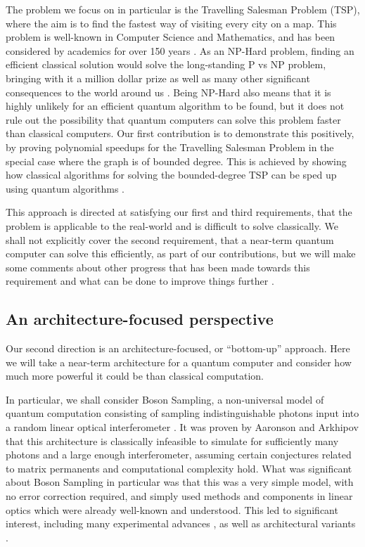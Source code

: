 The problem we focus on in particular is the Travelling Salesman Problem (TSP), where the aim is to find the fastest way of visiting every city on a map. This problem is well-known in Computer Science and Mathematics, and has been considered by academics for over 150 years \cite{schrijver2005}. As an NP-Hard problem, finding an efficient classical solution would solve the long-standing P vs NP problem, bringing with it a million dollar prize as well as many other significant consequences to the world around us \cite{cmipvsnp, aaronson2006}. Being NP-Hard also means that it is highly unlikely for an efficient quantum algorithm to be found, but it does not rule out the possibility that quantum computers can solve this problem faster than classical computers. Our first contribution is to demonstrate this positively, by proving polynomial speedups for the Travelling Salesman Problem in the special case where the graph is of bounded degree. This is achieved by showing how classical algorithms for solving the bounded-degree TSP \cite{eppstein2007, xiao2016degree3, xiao2016degree4} can be sped up using quantum algorithms \cite{montanaro2015, ronagh2019}.

This approach is directed at satisfying our first and third requirements, that the problem is applicable to the real-world and is difficult to solve classically. We shall not explicitly cover the second requirement, that a near-term quantum computer can solve this efficiently, as part of our contributions, but we will make some comments about other progress that has been made towards this requirement and what can be done to improve things further \cite{dunjko2018, ge2019}.

\subsection{An architecture-focused perspective}

Our second direction is an architecture-focused, or ``bottom-up'' approach. Here we will take a near-term architecture for a quantum computer and consider how much more powerful it could be than classical computation.

In particular, we shall consider Boson Sampling, a non-universal model of quantum computation consisting of sampling indistinguishable photons input into a random linear optical interferometer \cite{aaronson2010report, aaronson2011}. It was proven by Aaronson and Arkhipov that this architecture is classically infeasible to simulate for sufficiently many photons and a large enough interferometer, assuming certain conjectures related to matrix permanents and computational complexity hold. What was significant about Boson Sampling in particular was that this was a very simple model, with no error correction required, and simply used methods and components in linear optics which were already well-known and understood. This led to significant interest, including many experimental advances \cite{broome2013, spring2013, tillmann2013, crespi2013, carolan2015, wang2017, paesani2018, wang2019}, as well as architectural variants \cite{aaronson2013, lund2014, hamilton2017}.


